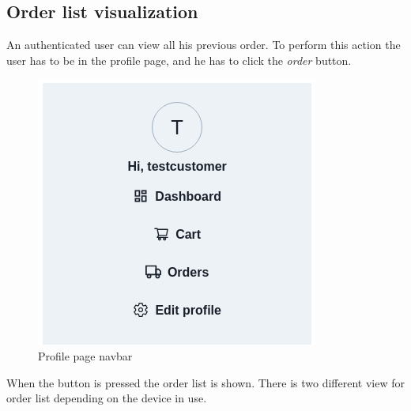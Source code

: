\subsection{Order list visualization}
An authenticated user can view all his previous order. To perform this action the user has to be in the profile page, and he has to click the \textit{order} button.
\begin{figure}[!ht]
    \caption{Profile page navbar}
    \vspace{10px}
    \includegraphics[scale=0.5]{../../../../Images/userManual/dashboardNavBar.png}
    \centering
\end{figure}
\newpage
When the button is pressed the order list is shown. There is two different view for order list depending on the device in use.
